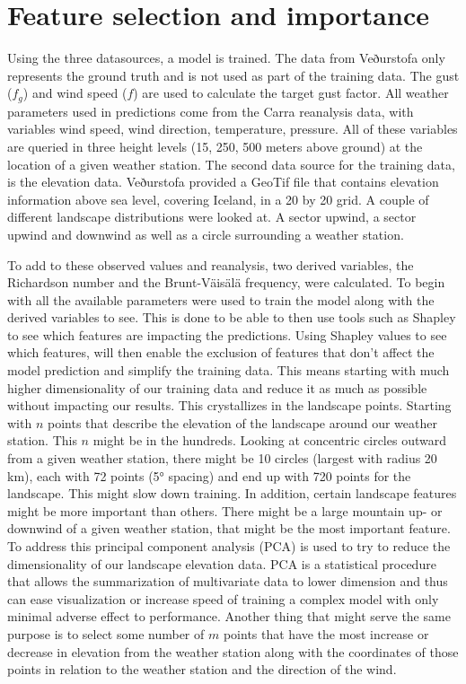 \section{Feature selection and importance}
Using the three datasources, a model is trained. The data from Veðurstofa only represents the ground truth and is not used as part of the training data. The gust ($f_g$) and wind speed ($f$) are used to calculate the target gust factor. All weather parameters used in predictions come from the Carra reanalysis data, with variables wind speed, wind direction, temperature, pressure. All of these variables are queried in three height levels (15, 250, 500 meters above ground) at the location of a given weather station. The second data source for the training data, is the elevation data. Veðurstofa provided a GeoTif file that contains elevation information above sea level, covering Iceland, in a 20 by 20 grid. A couple of different landscape distributions were looked at. A sector upwind, a sector upwind and downwind as well as a circle surrounding a weather station.

To add to these observed values and reanalysis, two derived variables, the Richardson number and the Brunt-Väisälä frequency, were calculated. To begin with all the available parameters were used to train the model along with the derived variables to see. This is done to be able to then use tools such as Shapley to see which features are impacting the predictions. Using Shapley values to see which features, will then enable the exclusion of features that don't affect the model prediction and simplify the training data. This means starting with much higher dimensionality of our training data and reduce it as much as possible without impacting our results. This crystallizes in the landscape points. Starting with $n$ points that describe the elevation of the landscape around our weather station. This $n$ might be in the hundreds. Looking at concentric circles outward from a given weather station, there might be 10 circles (largest with radius 20 km), each with 72 points (5° spacing) and end up with 720 points for the landscape. This might slow down training. In addition, certain landscape features might be more important than others. There might be a large mountain up- or downwind of a given weather station, that might be the most important feature. To address this principal component analysis (PCA) is used to try to reduce the dimensionality of our landscape elevation data. PCA is a statistical procedure that allows the summarization of multivariate data to lower dimension and thus can ease visualization or increase speed of training a complex model with only minimal adverse effect to performance\cite{pca_information}. Another thing that might serve the same purpose is to select some number of $m$ points that have the most increase or decrease in elevation from the weather station along with the coordinates of those points in relation to the weather station and the direction of the wind.

